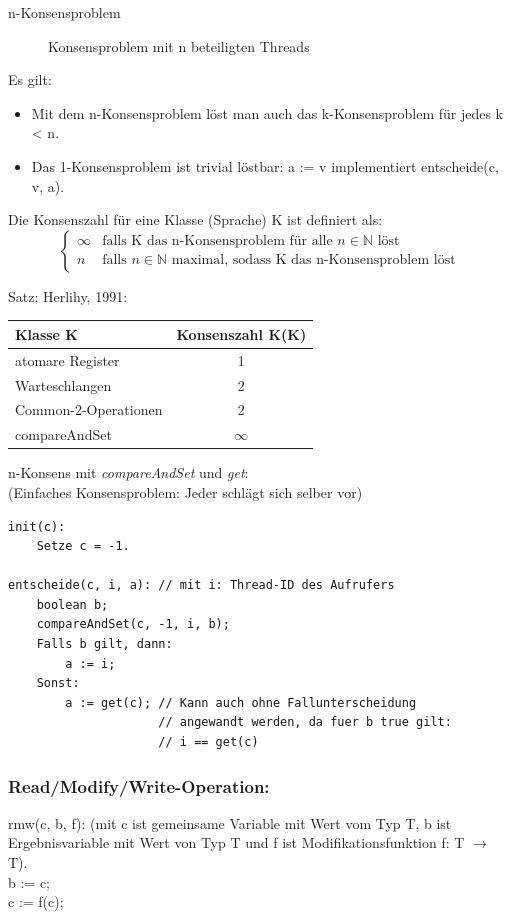 \begin{description}
	\item[n-Konsensproblem] Konsensproblem mit n beteiligten Threads
\end{description}

Es gilt:
\begin{itemize}
	\item Mit dem n-Konsensproblem löst man auch das k-Konsensproblem für jedes k < n.
	\item Das 1-Konsensproblem ist trivial löstbar: a := v implementiert entscheide(c, v, a).
\end{itemize}

Die Konsenszahl für eine Klasse (Sprache) K ist definiert als:
\begin{equation}
\begin{cases}
\infty & \text{falls K das n-Konsensproblem für alle $n \in \mathbb{N}$ löst}\\
n & \text{falls $n \in \mathbb{N}$ maximal, sodass K das n-Konsensproblem löst}
\end{cases}
\end{equation}

Satz: Herlihy, 1991:

\begin{center}
\begin{tabular}{l|c}
Klasse K & Konsenszahl K(K)\\ \hline
atomare Register & 1\\
Warteschlangen & 2\\
Common-2-Operationen & 2\\
compareAndSet & $\infty$
\end{tabular}
\end{center}

n-Konsens mit \emph{compareAndSet} und \emph{get}:\\
(Einfaches Konsensproblem: Jeder schlägt sich selber vor)\\
\begin{lstlisting}
init(c):
    Setze c = -1.

entscheide(c, i, a): // mit i: Thread-ID des Aufrufers
    boolean b;
    compareAndSet(c, -1, i, b);
    Falls b gilt, dann:
        a := i;
    Sonst:
        a := get(c); // Kann auch ohne Fallunterscheidung
                     // angewandt werden, da fuer b true gilt:
                     // i == get(c)
\end{lstlisting}

\subsubsection*{Read/Modify/Write-Operation:}
rmw(c, b, f): (mit c ist gemeinsame Variable mit Wert vom Typ T, b ist Ergebnisvariable mit Wert von Typ T und f ist Modifikationsfunktion f: T $\rightarrow$ T).\\
b := c;\\
c := f(c);\\

